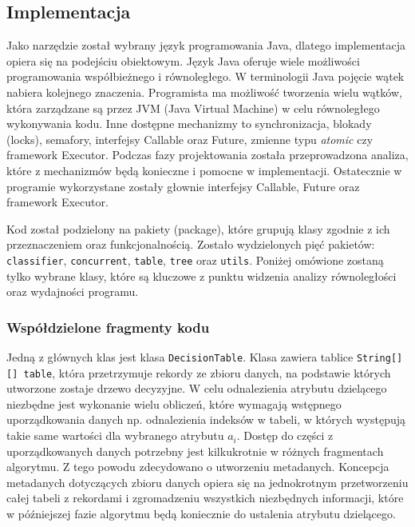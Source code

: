 \documentclass[12pt]{article}
\begin{document}
\subsection{Implementacja}

Jako narzędzie został wybrany język programowania Java, dlatego implementacja opiera się na podejściu
obiektowym. Język Java oferuje wiele możliwości programowania współbieżnego i równoległego. W terminologii Java
pojęcie wątek nabiera kolejnego znaczenia. Programista ma możliwość tworzenia wielu wątków, która zarządzane są
przez JVM (Java Virtual Machine) w celu równoległego wykonywania kodu. Inne dostępne mechanizmy to synchronizacja,
blokady (locks), semafory, interfejsy Callable oraz Future, zmienne typu \textit{atomic} czy framework Executor.
Podczas fazy projektowania została przeprowadzona analiza, które z mechanizmów będą konieczne i pomocne
w implementacji. Ostatecznie w programie wykorzystane zostały głownie interfejsy Callable, Future oraz framework Executor.

Kod został podzielony na pakiety (package), które grupują klasy zgodnie z ich przeznaczeniem oraz funkcjonalnością. Zostało wydzielonych pięć pakietów:
\verb|classifier|, \verb|concurrent|, \verb|table|, \verb|tree| oraz \verb|utils|. Poniżej omówione zostaną tylko wybrane klasy, które są kluczowe z
punktu widzenia analizy równoległości oraz wydajności programu.

\subsubsection{Współdzielone fragmenty kodu}

Jedną z głównych klas jest klasa \verb|DecisionTable|. Klasa zawiera tablice \verb|String[][] table|, która przetrzymuje rekordy ze zbioru danych,
na podstawie których utworzone zostaje drzewo decyzyjne. W celu odnalezienia atrybutu dzielącego niezbędne jest wykonanie wielu obliczeń, które wymagają 
wstępnego uporządkowania danych np. odnalezienia indeksów w tabeli, w których występują takie same wartości dla wybranego atrybutu $a_i$. 
Dostęp do części z uporządkowanych danych potrzebny jest kilkukrotnie w różnych fragmentach algorytmu. Z tego powodu zdecydowano o utworzeniu metadanych.
Koncepcja metadanych dotyczących zbioru danych opiera się na jednokrotnym przetworzeniu całej tabeli z rekordami i zgromadzeniu wszystkich niezbędnych
informacji, które w późniejszej fazie algorytmu będą koniecznie do ustalenia atrybutu dzielącego.
\end{document}
